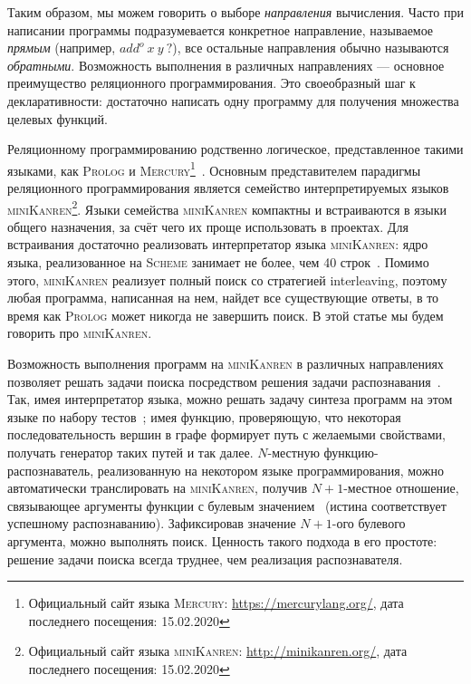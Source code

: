 \documentclass[conference,a4paper,american,russian]{IEEEtran}
\newcommand{\miniKanren}{\textsc{miniKanren}}
\newcommand{\mercury}{\textsc{Mercury}}
\newcommand{\prolog}{\textsc{Prolog}}
\newcommand{\scheme}{\textsc{Scheme}}
\begin{document}
Таким образом, мы можем говорить о выборе \textit{направления} вычисления.
Часто при написании программы подразумевается конкретное направление, называемое \textit{прямым} (например, $add^o  \ x \ y \ ?$), все остальные направления обычно называются \textit{обратными}.
Возможность выполнения в различных направлениях --- основное преимущество реляционного программирования.
Это своеобразный шаг к декларативности: достаточно написать одну программу для получения множества целевых функций.

Реляционному программированию родственно логическое, представленное такими языками, как \prolog{} и \mercury{}\footnote{Официальный сайт языка \mercury{}: \url{https://mercurylang.org/}, дата последнего посещения: 15.02.2020}~\cite{SOMOGYI199617}.
Основным представителем парадигмы реляционного программирования является семейство интерпретируемых языков \miniKanren{}\footnote{Официальный сайт языка \miniKanren{}: \url{http://minikanren.org/}, дата последнего посещения: 15.02.2020}.
Языки семейства \miniKanren{} компактны и встраиваются в языки общего назначения, за счёт чего их проще использовать в  проектах.
Для встраивания достаточно реализовать интерпретатор языка \miniKanren{}: ядро языка, реализованное на \scheme{} занимает не более, чем 40 строк~\cite{hemann2013ukanren}.
Помимо этого, \miniKanren{} реализует полный поиск со стратегией interleaving, поэтому любая программа, написанная на нем, найдет все существующие ответы, в то время как \prolog{} может никогда не завершить поиск.
В этой статье мы будем говорить про \miniKanren{}.

Возможность выполнения программ на \miniKanren{} в различных направлениях позволяет решать задачи поиска посредством решения задачи распознавания~\cite{lozov2019relational}.
Так, имея интерпретатор языка, можно решать задачу синтеза программ на этом языке по набору тестов~\cite{byrd2017unified}; имея функцию, проверяющую, что некоторая последовательность вершин в графе формирует путь с желаемыми свойствами, получать генератор таких путей и так далее.
$N$-местную функцию-распознаватель, реализованную на некотором языке программирования, можно автоматически транслировать на \miniKanren{}, получив $N+1$-местное отношение, связывающее аргументы функции с булевым значением~\cite{lozov2019relational} (истина соответствует успешному распознаванию).
Зафиксировав значение $N+1$-ого булевого аргумента, можно выполнять поиск.
Ценность такого подхода в его простоте: решение задачи поиска всегда труднее, чем реализация распознавателя.
\end{document}
